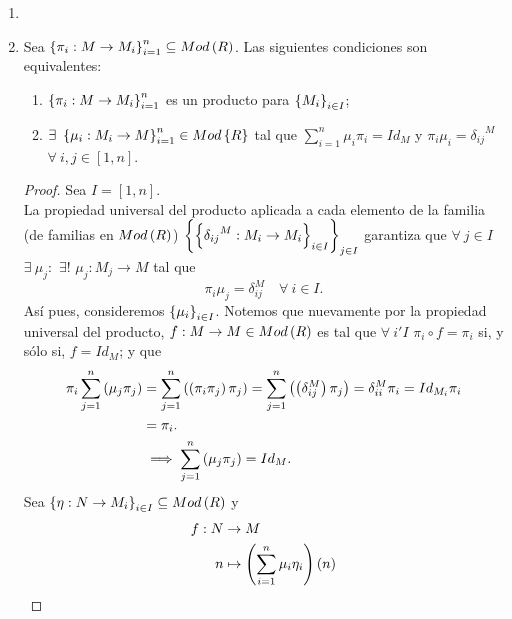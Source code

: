 \documentclass{article}
\begin{document}
\begin{enumerate}[label=\textbf{Ej \arabic*.}]
\begin{proof}
		$\boxed{\lrprth{b}\Rightarrow\lrprth{a}}$ Observe que $\lrbrack{Proy_{i}:\displaystyle\prod_{i \in I} M_{i} \longrightarrow M_{i}}_{i \in I}$ es una familia de morfismos en $Mod\lrprth{R}$. En virtud de que $P$ y $\lrbrack{\pi_{i}:P \longrightarrow M_{i}}_{i \in I}$ son un producto para $\arbtfam{M}{i}{I}$ , existe un único morfismo $\varphi:\displaystyle\prod_{i \in I} M_{i} \longrightarrow P$ tal que, para cada $i \in I$, $\pi_{i}\circ\varphi = Proy_{i}$. En vista de ésto, se concluye el resultado.
	\end{proof} 
	\item 
	\item Sea $\left\{\pi_i:M\to M_i\right\}_{i=1}^n\subseteq Mod\left(R\right)$. Las siguientes condiciones son equivalentes:
	\begin{enumerate}[label=\alph*)]
		\item $\left\{\pi_i:M\to M_i\right\}_{i=1}^n$ es un producto para $\arbtfam{M}{i}{I}$;
		\item $\exists\ \left\{\mu_i:M_i\to M\right\}_{i=1}^n\in Mod\left\{R\right\}$ tal que $\sum_{i=1}^n\mu_i\pi_i=Id_M$ y $\pi_i\mu_i={\delta_{ij}}^M$ $\forall\ i,j\in[1,n]$.
	\end{enumerate}
	\begin{proof}
		Sea $I=[1,n]$.\\
		\boxed{\implies} La propiedad universal del producto aplicada a cada elemento de la familia (de familias en $Mod\lrprth{R}$) $\left\{\left\{{\delta_{ij}}^M:M_i\to M_i\right\}_{i\in I}\right\}_{j\in I}$ garantiza que $\forall\ j\in I$ $\exists\ \mu_j:$ $\exists !$ $\mu_j:M_j\to M$ tal que \begin{equation*}
			\pi_i\mu_j=\delta_{ij}^M\quad \forall\ i\in I.
		\end{equation*}
	Así pues, consideremos ${\left\{{\mu}_{i}\right\}}_{i\in I}$. Notemos que nuevamente por la propiedad universal del producto, $f:M\to M\in Mod\left(R\right)$ es tal que $\forall\ i' I$ $\pi_i\circ f=\pi_i$ si, y sólo si, $f=Id_M$; y que
	\begin{align*}
		\pi_i\sum_{j=1}^n\left(\mu_j\pi_j\right)&=\sum_{j=1}^n\left(\left(\pi_i\pi_j\right)\pi_j\right)=\sum_{j=1}^n\left(\left(\delta_{ij}^M\right)\pi_j\right)=\delta_{ii}^M\pi_i=Id_{M_i}\pi_i\\
		&=\pi_i.\\
		&\implies \sum_{j=1}^n\left(\mu_j\pi_j\right)=Id_M.
	\end{align*} 
	\boxed{\impliedby} Sea $\left\{\eta:N\to M_i\right\}_{i\in I}\subseteq Mod\left(R\right)$ y 
	\begin{align*}
		\descapp{f}{N}{M}{n}{\lrprth{\sum_{i=1}^n\mu_i\eta_i}\lrprth{n}}{}

\end{align*}
\end{proof}
\end{enumerate}
\end{document}

